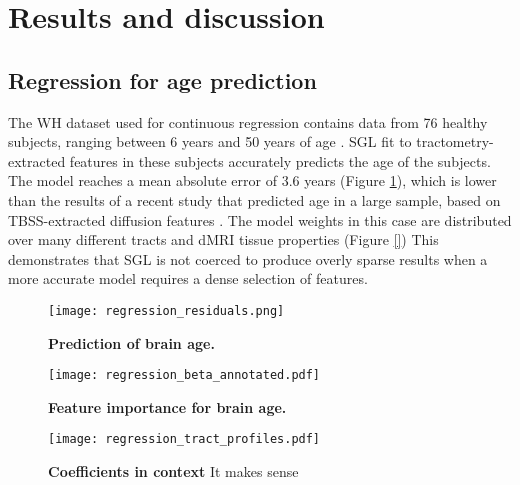 \section*{Results and discussion}

\subsection*{Regression for age prediction}
The WH dataset used for continuous regression contains data from 76 healthy
subjects, ranging between 6 years and 50 years of age
\cite{yeatman2014lifespan}. SGL fit to tractometry-extracted features in these
subjects accurately predicts the age of the subjects. The model reaches a mean
absolute error of 3.6 years (Figure \ref{fig:regress-results}), which is lower
than the results of a recent study that predicted age in a large sample, based
on TBSS-extracted diffusion features \cite{Richard2018-ux}. The model weights
in this case are distributed over many different tracts and dMRI tissue
properties (Figure \ref{}) This demonstrates that SGL is not coerced to produce overly sparse
results when a more accurate model requires a dense selection of features.


\begin{figure}[!h]
    \centering
    \texttt{[image: regression\_residuals.png]}
    \caption{{\bf Prediction of brain age.}
    }
    \label{fig:regress-results}
\end{figure}

\begin{figure}[!h]
    \centering
    \texttt{[image: regression\_beta\_annotated.pdf]}
    \caption{{\bf Feature importance for brain age.}
    }
    \label{fig:regress-beta}
\end{figure}


\begin{figure}[!h]
    \centering
    \texttt{[image: regression\_tract\_profiles.pdf]}
    \caption{{\bf Coefficients in context}
    It makes sense
    }
    \label{fig:regress-profiles}
\end{figure}


